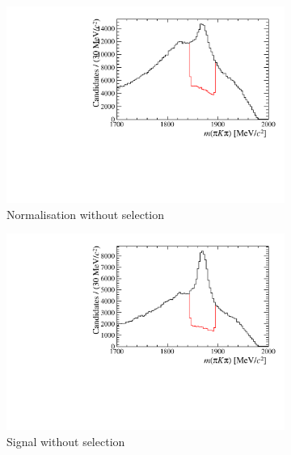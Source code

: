 \begin{figure}[!h]
    \centering
    \begin{subfigure}[t]{0.4\textwidth}
        \includegraphics[width=1.0\textwidth]{figs/Selection/B2DsD0_Ds2KKPi_D_Veto_NoBDT.pdf}
        \caption{Normalisation without selection}
    \end{subfigure}%
    \begin{subfigure}[t]{0.4\textwidth}
        \includegraphics[width=1.0\textwidth]{figs/Selection/B2DsPhi_Ds2KKPi_D_Veto_NoBDT.pdf}
        \caption{Signal without selection}
    \end{subfigure}\\
    \begin{subfigure}[t]{0.4\textwidth}

\end{subfigure}
\end{figure}

